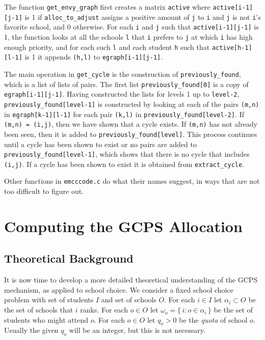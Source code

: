 \documentclass[12pt]{article}
\theoremstyle{definition}
\begin{document}
\begin{appendix}
The function \texttt{get\_envy\_graph} first creates a matrix
\texttt{active} where \texttt{active[i-1][j-1]} is 1 if
\texttt{alloc\_to\_adjust} assigns a positive amount of \texttt{j} to
\texttt{i} and \texttt{j} is not \texttt{i}'s favorite school, and 0
otherwise.  For each \texttt{i} and \texttt{j} such that
\texttt{active[i-1][j-1]} is 1, the function looks at all the schools
\texttt{l} that \texttt{i} prefers to \texttt{j} at which \texttt{i} has 
high enough priority, and for each such \texttt{l} and each student
\texttt{h} such that \texttt{active[h-1][l-1]} is 1 it appends
\texttt{(h,l)} to \texttt{egraph[i-1][j-1]}.

The main operation in \texttt{get\_cycle} is the construction of
\texttt{previously\_found}, which is a list of lists of pairs.  The
first list \texttt{previously\_found[0]} is a copy of
\texttt{egraph[i-1][j-1]}.  Having constructed the lists for levels 1
up to \texttt{level-2}, \texttt{previously\_found[level-1]} is
constructed by looking at each of the pairs \texttt{(m,n)} in
\texttt{egraph[k-1][l-1]} for each pair \texttt{(k,l)} in
\texttt{previously\_found[level-2]}.  If \texttt{(m,n) = (i,j)}, then
we have shown that a cycle exists.  If \texttt{(m,n)} has not already
been seen, then it is added to \texttt{previously\_found[level]}.
This process continues until a cycle has been shown to exist or no
pairs are added to \texttt{previously\_found[level-1]}, which shows
that there is no cycle that includes \texttt{(i,j)}.  If a cycle has
been shown to exist it is obtained from \texttt{extract\_cycle}.

Other functions in \texttt{emcccode.c} do what their names suggest, in
ways that are not too difficult to figure out.

\section{Computing the GCPS Allocation}

\subsection{Theoretical Background}

It is now time to develop a more detailed theoretical understanding of
the GCPS mechanism, as applied to school choice.  We consider a fixed
school choice problem with set of students $I$ and set of schools $O$.
For each $i \in I$ let $\alpha_i \subset O$ be the set of schools that
$i$ ranks. For each $o \in O$ let $\omega_o = \{\, i : o \in \alpha_i
\,\}$ be the set of students who might attend $o$. For each $o \in O$
let $q_o > 0$ be the \emph{quota} of school $o$.  Usually the given
$q_o$ will be an integer, but this is not necessary.


\end{appendix}
\end{document}
